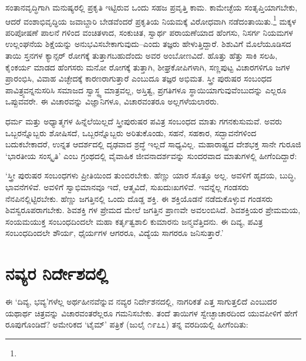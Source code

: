 ಸಂತಾನವೃದ್ಧಿಗಾಗಿ ಮನುಷ್ಯರಲ್ಲಿ ಪ್ರಕೃತಿ ಇಟ್ಟಿರುವ ಒಂದು ಸಹಜ ಪ್ರವೃತ್ತಿ ಕಾಮ. ಕಾಮೇಚ್ಛೆಯ ಸಂತೃಪ್ತಿಯಾಗಬೇಕು, ಆದರೆ ವಂಶಾಭಿವೃದ್ಧಿಯ ಜವಾಬ್ದಾರಿ ಬೇಡವೆಂದರೆ ಪ್ರಕೃತಿಯ ನಿಯಮಕ್ಕೆ ವಿರೋಧವಾಗಿ ನಡೆದಂತಾಯಿತು.\footnote{} ಮಕ್ಕಳ ಪರಿಪೋಷಣೆ ಪಾಲನೆ ಗಳಿಂದ ವಂಚಿತಳಾದ, ಸಂಕುಚಿತ, ಸ್ವಾರ್ಥ ಪರಾಯಣೆಯಾದ ಹೆಂಗಸು, ನಿಸರ್ಗ ನಿಯಮಗಳ ಉಲ್ಲಂಘನೆಯ ಶಿಕ್ಷೆಯನ್ನು ಅನುಭವಿಸಬೇಕಾಗುವುದು–ಎಂದು ತಜ್ಞರು ಹೇಳುತ್ತಿದ್ದಾರೆ. ಶಿಶುವಿಗೆ ಮೊಲೆಯೂಡಿಸದ ತಾಯಿ ಸ್ತನಗಳ ಕ್ಯಾನ್ಸರ್ ರೋಗಕ್ಕೆ ತುತ್ತಾಗಬಹುದೆಂದು ಅವರ ಅಂಬೋಣವಿದೆ. ಹೊತ್ತು ಹೆತ್ತು ಸಾಕಿ ಸಲಹಿ, ಕೈಂಕರ್ಯ ಮಾಡದ ಹೆಂಗಸರು ಮನೋ ರೋಗಕ್ಕೆ ತುತ್ತಾಗಿ, ಶೀಘ್ರಕೋಪಿಗಳಾಗಿ, ಸಣ್ಣಪುಟ್ಟ ವಿಚಾರಗಳಿಗೂ ಜಗಳ ಪ್ರಾರಂಭಿಸಿ, ವಿವಾಹ ವಿಚ್ಛೇದಕ್ಕೆ ಕಾರಣರಾಗುತ್ತಾರೆ ಎಂಬುದೂ ತಜ್ಞರ ಅಭಿಮತ. ಸ್ತ್ರೀ ಪುರುಷರ ಸಂಬಂಧದ ಪಾವಿತ್ರ್ಯವನ್ನನುಸರಿಸಿ ಸಮಾಜದ ಸ್ವಾಸ್ಥ್ಯ ಮಾತ್ರವಲ್ಲ, ಅಸ್ತಿತ್ವ, ಪ್ರಗತಿಗಳೂ ಸ್ಥಾಯಿಯಾಗುವುವೆಂಬುದನ್ನು ಎಲ್ಲರೂ ಒಪ್ಪುವವರೇ. ಈ ವಿಚಾರವನ್ನು ವಿಜ್ಞಾನಿಗಳೂ, ವಿಚಾರವಂತರೂ ಅಲ್ಲಗಳೆಯಲಾರರು.

ಧರ್ಮ ಮತ್ತು ಅಧ್ಯಾತ್ಮಗಳ ಹಿನ್ನೆಲೆಯಿಲ್ಲದೆ ಸ್ತ್ರೀಪುರುಷರ ಪವಿತ್ರ ಸಂಬಂಧದ ಮಾತು ಗಗನಕುಸುಮವೆ. ಅವರು ಒಬ್ಬರನ್ನೊಬ್ಬರು ಶೋಷಿಸದೆ, ಒಬ್ಬರನ್ನೊಬ್ಬರು ಅರಿತುಕೊಂಡು, ಸಹನೆ, ಸಹಕಾರ, ಸದ್ಭಾವನೆಗಳಿಂದ ಬದುಕಬೇಕಾದರೆ, ಉನ್ನತ ಆದರ್ಶದಲ್ಲಿ ದೃಢವಾದ ಶ್ರದ್ಧೆ ಇಲ್ಲದೆ ಸಾಧ್ಯವಿಲ್ಲ. ಮಹಾರಾಷ್ಟ್ರದ ದೇಶಭಕ್ತ ಸಾನೇ ಗುರೂಜಿ ‘ಭಾರತೀಯ ಸಂಸ್ಕೃತಿ’ ಎಂಬ ಗ್ರಂಥದಲ್ಲಿ ವೈವಾಹಿಕ ಜೀವನಾದರ್ಶವನ್ನು ಸುಂದರವಾದ ಮಾತುಗಳಲ್ಲಿ ಹೀಗೆಂದಿದ್ದಾರೆ:

‘ಸ್ತ್ರೀ ಪುರುಷರ ಸಂಬಂಧಗಳು ಪ್ರೀತಿಯಿಂದ ತುಂಬಿರಬೇಕು. ಹೆಣ್ಣು ಯಾರ ಸೊತ್ತೂ ಅಲ್ಲ. ಅವಳಿಗೆ ಹೃದಯ, ಬುದ್ಧಿ, ಭಾವನೆಗಳಿವೆ. ಅವಳಿಗೆ ಸ್ವಾಭಿಮಾನವೂ ಇದೆ, ಆತ್ಮವಿದೆ, ಸುಖದುಃಖಗಳಿವೆ. ಇವನ್ನೆಲ್ಲ ಗಂಡಸರು ನೆನಪಿನಲ್ಲಿಟ್ಟಿರಬೇಕು. ಹೆಣ್ಣು ಜಗತ್ತಿನಲ್ಲಿ ಒಂದು ದೊಡ್ಡ ಶಕ್ತಿ. ಈ ಶಕ್ತಿಯೊಡನೆ ನಡೆದುಕೊಳ್ಳುವ ಗಂಡಸರು ಶಿವಸ್ವರೂಪರಾಗಬೇಕು. ಶಿವಶಕ್ತಿ ಗಳ ಪ್ರೇಮದ ಮೇಲೆ ಜಗತ್ತಿನ ಪ್ರಾಣವೇ ಅವಲಂಬಿಸಿದೆ. ಶಿವಶಕ್ತಿಯರ ಪ್ರೇಮಮಯ, ಸಂಯಮಯುಕ್ತ ಸಂಬಂಧದಿಂದಲೇ ಮಹಾ ಕರ್ತೃತ್ವಶಾಲಿ ಕುಮಾರನು ಜನ್ಮವೆತ್ತಿದನು. ಈ ದಿವ್ಯ, ಪವಿತ್ರ ಸಂಬಂಧದಿಂದಲೇ ಶೌರ್ಯ, ಧೈರ್ಯಗಳ ಆಗರರೂ, ವಿದ್ಯೆಯ ಸಾಗರರೂ ಜನಿಸುತ್ತಾರೆ.’


\section{ನವ್ಯರ ನಿರ್ದೇಶದಲ್ಲಿ}

ಈ ‘ದಿವ್ಯ, ಭವ್ಯ’ಗಳೆಲ್ಲ ಅರ್ಥಹೀನವೆನ್ನುವ ನವ್ಯರ ನಿರ್ದೇಶನದಲ್ಲಿ, ನಾಗರಿಕತೆ ಎತ್ತ ಸಾಗುತ್ತಲಿದೆ ಎಂಬುದರ ಯಥಾರ್ಥ ಚಿತ್ರವನ್ನು ವಿಚಾರವಂತರೆಲ್ಲರೂ ಗಮನಿಸಬೇಕು. ತಂದೆ ತಾಯಿಗಳ ಸ್ವೇಚ್ಛಾಚಾರದಿಂದ ಯುವಪೀಳಿಗೆ ಹೇಗೆ ರೂಪುಗೊಂಡಿದೆ? ಅಮೇರಿಕದ ‘ಟೈಮ್​’ ಪತ್ರಿಕೆ (ಜುಲೈ ೧೯೭೭) ತನ್ನ ವರದಿಯಲ್ಲಿ ಹೀಗೆಂದಿತು:

